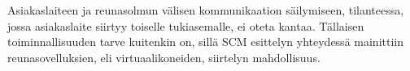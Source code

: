 Asiakaslaiteen ja reunasolmun välisen kommunikaation säilymiseen, tilanteessa, jossa asiakaslaite siirtyy toiselle tukiasemalle, ei oteta kantaa. 
Tällaisen toiminnallisuuden tarve kuitenkin on, sillä SCM esittelyn yhteydessä mainittiin reunasovelluksien, eli virtuaalikoneiden, siirtelyn mahdollisuus.
%
%

